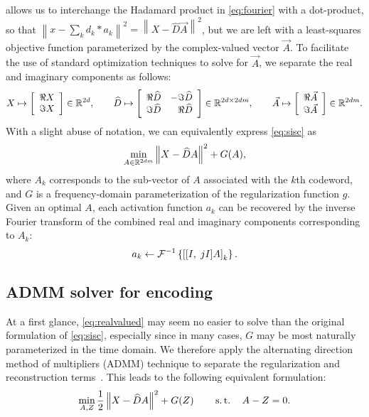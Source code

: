 \documentclass{article} %
\begin{document}
 allows us to interchange the Hadamard product in
\eqref{eq:fourier} with a dot-product, so that 
$\left\|x - \sum_k d_k * a_k\right\|^2 =  \left\|X - \widehat{D}\vec{A}\right\|^2$,
but we are left with a least-squares objective function parameterized by the complex-valued 
vector $\vec{A}$. To facilitate the use of standard optimization techniques to solve for
$\vec{A}$, we separate the real and imaginary components as follows:
\begin{equation}
X \mapsto \left[\begin{array}{r}\Re X \\ \Im X\end{array}\right] \in \mathbb{R}^{2d},
\quad\quad \widehat{D} \mapsto \left[\begin{array}{rr}\Re \widehat{D} & - \Im \widehat{D}\\
\Im \widehat{D} & \Re \widehat{D}\end{array}\right] \in \mathbb{R}^{2d\times 2dm},
\quad\quad \vec{A} \mapsto \left[\begin{array}{r}\Re \vec{A} \\ \Im \vec{A}\end{array}\right]
\in \mathbb{R}^{2dm}.\label{eq:realized}
\end{equation}
With a slight abuse of notation, we can equivalently express \eqref{eq:sisc} as
\begin{equation}
\min_{A \in \mathbb{R}^{2dm}} \left\|X - \widehat{D}A\right\|^2 + G(A),\label{eq:realvalued}
\end{equation}
where $A_k$ corresponds to the sub-vector of $A$ associated with the $k$th codeword, and 
$G$ is a frequency-domain parameterization of the regularization function $g$.
Given an optimal $A$, each activation function $a_k$ can be 
recovered by the inverse Fourier transform of the combined real and imaginary components
corresponding to $A_k$:
\begin{equation}
a_k \leftarrow \mathcal{F}^{-1} \left\{ {\left[[I,\; jI]A \right]}_k
\right\}.\label{eq:complexify}
\end{equation}

\subsection{ADMM solver for encoding}
\label{sec:solver}
At a first glance, \eqref{eq:realvalued} may seem no easier to solve than the original
formulation of \eqref{eq:sisc}, especially since in many cases, $G$ may be most
naturally parameterized in the time domain.  We therefore apply the alternating
direction method of multipliers (ADMM) technique to separate the regularization and
reconstruction terms~\cite{boyd2011}.  This leads to the following equivalent
formulation:
\begin{equation}
\min_{A, Z} \frac{1}{2}\left\|X - \widehat{D}A\right\|^2 + G(Z)
\quad\quad \operatorname{s.t.}\quad A - Z = 0.\label{eq:admm}
\end{equation}
\end{document}
